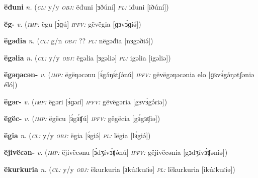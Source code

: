 \newentry
\headword\textbf{ëđuni}  
\ipa{[ɜðúní]}
\synpos\textit{n.} 
\class(\textit{\textsc{cl:}} {y/y}
\object\textit{\textsc{obj:}} ëđuni [ɜðúní]
\plural\textit{\textsc{pl:}} iđuni [iðúní])


\newentry
\headword\textbf{ëg-}  
\ipa{[ɜ́ɡ-]}
\synpos\textit{v.} 
\imperative(\textit {\textsc{imp:}} ëgu [ɜ́ɡú] \imperfective\textit{\textsc{ipfv:}} gëvëgia [ɡɜvɜ́ɡiə́])


\newentry
\headword\textbf{ëgəđia}  
\ipa{[ɜgəðiə́]}
\synpos\textit{n.} 
\class(\textit{\textsc{cl:}} {g/n}
\object\textit{\textsc{obj:}} ??
\plural\textit{\textsc{pl:}} nëgəđia [nɜgəðiə́])

\newentry
\headword\textbf{ëgəlia}  
\ipa{[ɜgəliə]}
\synpos\textit{n.} 
\class(\textit{\textsc{cl:}} {y/y}
\object\textit{\textsc{obj:}} ëgəlia [ɜgəliə]
\plural\textit{\textsc{pl:}} igəlia [igəliə])

\newentry
\headword\textbf{ëgəŋəcən-}  
\synpos\textit{v.} 
\imperative(\textit {\textsc{imp:}} ëgëŋəcənu [ɜ́gə́ŋɜ́tʃə́nú] %
\imperfective\textit{\textsc{ipfv:}} gëvëgəŋəcənia elo [ɡɜvɜ́gə́ŋətʃəniə éló])

\newentry
\headword\textbf{ëgər-}  
\ipa{[ɜgə́r-]}
\synpos\textit{v.} 
\imperative(\textit {\textsc{imp:}} ëgəri [ɜ́ɡəɾí] 
\imperfective\textit{\textsc{ipfv:}} gëvëgəria [gɜvɜ́gə́ɾiə])

\newentry
\headword\textbf{ëgëc-}  
\ipa{[ɜ́gɜʧ-]}
\synpos\textit{v.} 
\imperative(\textit {\textsc{imp:}} ëgëcu [ɜ́gɜ́ʧú] 
\imperfective\textit{\textsc{ipfv:}} gëgëcia [gɜ́gɜʧiə])

\newentry
\headword\textbf{ëgia}  
\ipa{[ɜ́giə́]}
\synpos\textit{n.} 
\class(\textit{\textsc{cl:}} {y/y}
\object\textit{\textsc{obj:}} ëgia [ɜ́giə́]
\plural\textit{\textsc{pl:}} lëgia [lɜ́giə́])

\newentry
\headword\textbf{ëjivëcən-}  
\synpos\textit{v.} 
\imperative(\textit {\textsc{imp:}} ëjivëcənu [ɜ́dʒívɜ́ʧə́nú] 
\imperfective\textit{\textsc{ipfv:}} gëjivëcənia [gɜdʒívɜ́ʧəniə])


\newentry
\headword\textbf{ëkurkuria}  
\synpos\textit{n.} 
\class(\textit{\textsc{cl:}} {y/y}
\object\textit{\textsc{obj:}} ëkurkuria [ɜkúɾkuɾiə]
\plural\textit{\textsc{pl:}} lëkurkuria [ikúɾkuɾiə])

